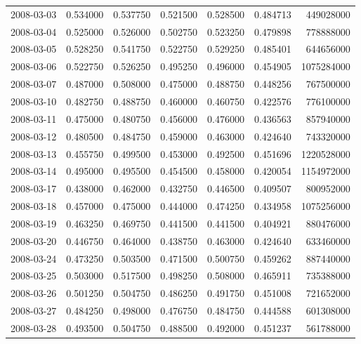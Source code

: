 \begin{tabular}{lrrrrrr}
2008-03-03 &    0.534000 &    0.537750 &    0.521500 &    0.528500 &    0.484713 &   449028000 \\
2008-03-04 &    0.525000 &    0.526000 &    0.502750 &    0.523250 &    0.479898 &   778888000 \\
2008-03-05 &    0.528250 &    0.541750 &    0.522750 &    0.529250 &    0.485401 &   644656000 \\
2008-03-06 &    0.522750 &    0.526250 &    0.495250 &    0.496000 &    0.454905 &  1075284000 \\
2008-03-07 &    0.487000 &    0.508000 &    0.475000 &    0.488750 &    0.448256 &   767500000 \\
2008-03-10 &    0.482750 &    0.488750 &    0.460000 &    0.460750 &    0.422576 &   776100000 \\
2008-03-11 &    0.475000 &    0.480750 &    0.456000 &    0.476000 &    0.436563 &   857940000 \\
2008-03-12 &    0.480500 &    0.484750 &    0.459000 &    0.463000 &    0.424640 &   743320000 \\
2008-03-13 &    0.455750 &    0.499500 &    0.453000 &    0.492500 &    0.451696 &  1220528000 \\
2008-03-14 &    0.495000 &    0.495500 &    0.454500 &    0.458000 &    0.420054 &  1154972000 \\
2008-03-17 &    0.438000 &    0.462000 &    0.432750 &    0.446500 &    0.409507 &   800952000 \\
2008-03-18 &    0.457000 &    0.475000 &    0.444000 &    0.474250 &    0.434958 &  1075256000 \\
2008-03-19 &    0.463250 &    0.469750 &    0.441500 &    0.441500 &    0.404921 &   880476000 \\
2008-03-20 &    0.446750 &    0.464000 &    0.438750 &    0.463000 &    0.424640 &   633460000 \\
2008-03-24 &    0.473250 &    0.503500 &    0.471500 &    0.500750 &    0.459262 &   887440000 \\
2008-03-25 &    0.503000 &    0.517500 &    0.498250 &    0.508000 &    0.465911 &   735388000 \\
2008-03-26 &    0.501250 &    0.504750 &    0.486250 &    0.491750 &    0.451008 &   721652000 \\
2008-03-27 &    0.484250 &    0.498000 &    0.476750 &    0.484750 &    0.444588 &   601308000 \\
2008-03-28 &    0.493500 &    0.504750 &    0.488500 &    0.492000 &    0.451237 &   561788000 \\

\end{tabular}
